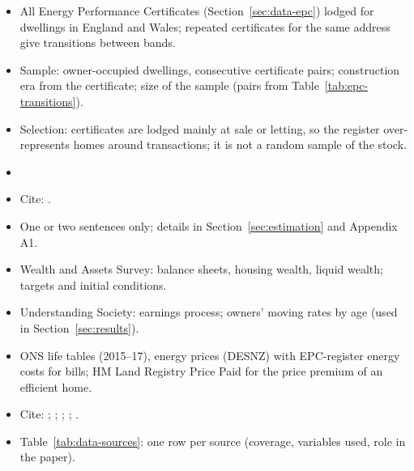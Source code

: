 \begin{itemize}
  \item All Energy Performance Certificates (Section~\ref{sec:data-epc})
    lodged for dwellings in England and Wales; repeated
    certificates for the same address give transitions between bands.
  \item Sample: owner-occupied dwellings, consecutive certificate pairs;
    construction era from the certificate; size of the sample (pairs from
    Table~\ref{tab:epc-transitions}).
  \item Selection: certificates are lodged mainly at sale or letting, so the
    register over-represents homes around transactions; it is not a random
    sample of the stock.
  \item {}
  \item Cite: .
\end{itemize}

\begin{itemize}
  \item One or two sentences only; details in Section~\ref{sec:estimation}
    and Appendix A1.
  \item Wealth and Assets Survey: balance sheets, housing wealth, liquid
    wealth; targets and initial conditions.
  \item Understanding Society: earnings process; owners' moving rates by age
    (used in Section~\ref{sec:results}).
  \item ONS life tables (2015--17), energy prices (DESNZ) with EPC-register
    energy costs for bills; HM Land Registry Price Paid for the price
    premium of an efficient home.
  \item Cite: ;
    ;
    ; ; .
  \item Table~\ref{tab:data-sources}: one row per source (coverage, variables
    used, role in the paper).
\end{itemize}

\begin{table}[t]
  \centering
  \caption{Data sources}\label{tab:data-sources}
\end{table}

